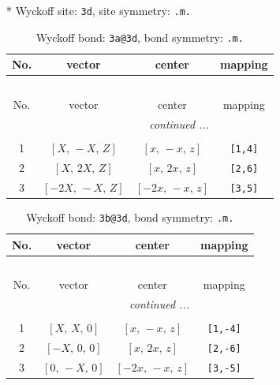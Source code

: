 \documentclass[fleqn,8pt]{jsarticle}
\begin{document}
* Wyckoff site: {\tt 3d}, site symmetry: {\tt .m.}
\renewcommand{\arraystretch}{1.2}
\begin{longtable}{cccc}
\caption{Wyckoff bond: {\tt 3a@3d}, bond symmetry: {\tt .m.}}
 \\
 \hline \hline
No. & vector & center & mapping \\ \hline \endfirsthead

\multicolumn{3}{l}{\tablename\ \thetable{}} \\
 \hline \hline
No. & vector & center & mapping \\ \hline \endhead

 \hline \hline
\multicolumn{3}{r}{\footnotesize\it continued ...} \\ \endfoot

 \hline \hline
\multicolumn{3}{r}{} \\ \endlastfoot

1 & $\left[ X,\, - X,\, Z \right]$ & $\left[ x,\, - x,\, z \right]$ & {\tt [1,4]} \\ \hline
2 & $\left[ X,\, 2 X,\, Z \right]$ & $\left[ x,\, 2 x,\, z \right]$ & {\tt [2,6]} \\ \hline
3 & $\left[ - 2 X,\, - X,\, Z \right]$ & $\left[ - 2 x,\, - x,\, z \right]$ & {\tt [3,5]} \\
\end{longtable}
\renewcommand{\arraystretch}{1.2}
\begin{longtable}{cccc}
\caption{Wyckoff bond: {\tt 3b@3d}, bond symmetry: {\tt .m.}}
 \\
 \hline \hline
No. & vector & center & mapping \\ \hline \endfirsthead

\multicolumn{3}{l}{\tablename\ \thetable{}} \\
 \hline \hline
No. & vector & center & mapping \\ \hline \endhead

 \hline \hline
\multicolumn{3}{r}{\footnotesize\it continued ...} \\ \endfoot

 \hline \hline
\multicolumn{3}{r}{} \\ \endlastfoot

1 & $\left[ X,\, X,\, 0 \right]$ & $\left[ x,\, - x,\, z \right]$ & {\tt [1,-4]} \\ \hline
2 & $\left[ - X,\, 0,\, 0 \right]$ & $\left[ x,\, 2 x,\, z \right]$ & {\tt [2,-6]} \\ \hline
3 & $\left[ 0,\, - X,\, 0 \right]$ & $\left[ - 2 x,\, - x,\, z \right]$ & {\tt [3,-5]} \\
\end{longtable}
\end{document}
